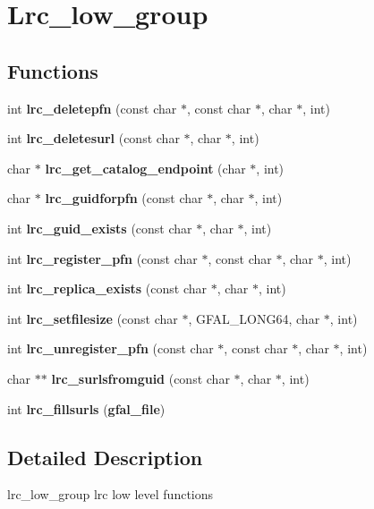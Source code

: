 \section{Lrc\_\-low\_\-group}
\label{group__lrc__low__group}
\subsection*{Functions}
\begin{DoxyCompactItemize}
\item 
int {\bfseries lrc\_\-deletepfn} (const char $\ast$, const char $\ast$, char $\ast$, int)\label{group__lrc__low__group_ga7309d15f051e41403f0cb786598b80fb}

\item 
int {\bfseries lrc\_\-deletesurl} (const char $\ast$, char $\ast$, int)\label{group__lrc__low__group_gac0870879a1f26e7158ae55e190a1fc03}

\item 
char $\ast$ {\bfseries lrc\_\-get\_\-catalog\_\-endpoint} (char $\ast$, int)\label{group__lrc__low__group_ga95bc75a1f70d26ba2035ff9c8db4d5ae}

\item 
char $\ast$ {\bfseries lrc\_\-guidforpfn} (const char $\ast$, char $\ast$, int)\label{group__lrc__low__group_ga1aa3f3b3770ff51e309848a4b03450ea}

\item 
int {\bfseries lrc\_\-guid\_\-exists} (const char $\ast$, char $\ast$, int)\label{group__lrc__low__group_gacc5a2dc9191e4afc2c6a354795b95b4c}

\item 
int {\bfseries lrc\_\-register\_\-pfn} (const char $\ast$, const char $\ast$, char $\ast$, int)\label{group__lrc__low__group_ga72e67ba829eec747f75084676847464a}

\item 
int {\bfseries lrc\_\-replica\_\-exists} (const char $\ast$, char $\ast$, int)\label{group__lrc__low__group_ga7ad39cb107a2427fc3bebb34f98f93a8}

\item 
int {\bfseries lrc\_\-setfilesize} (const char $\ast$, GFAL\_\-LONG64, char $\ast$, int)\label{group__lrc__low__group_gae5c3aba2176780e89cd7197b3b22251d}

\item 
int {\bfseries lrc\_\-unregister\_\-pfn} (const char $\ast$, const char $\ast$, char $\ast$, int)\label{group__lrc__low__group_gabf68d94947f3430185396190bd986fb7}

\item 
char $\ast$$\ast$ {\bfseries lrc\_\-surlsfromguid} (const char $\ast$, char $\ast$, int)\label{group__lrc__low__group_gacbceb1cb3b1d5ee0e4745fc7c81539ea}

\item 
int {\bfseries lrc\_\-fillsurls} ({\bf gfal\_\-file})\label{group__lrc__low__group_gafef94475a7553d2853718d071abedce5}

\end{DoxyCompactItemize}


\subsection{Detailed Description}
lrc\_\-low\_\-group lrc low level functions 